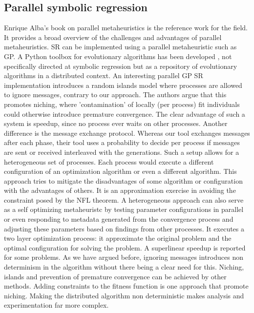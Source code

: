 \subsection{Parallel symbolic regression}
Enrique Alba's book \cite{parallelmetaheuristics} on parallel metaheuristics is the reference work for the field. It provides a broad overview of the challenges and advantages of parallel metaheuristics.  SR can be implemented using a parallel metaheuristic such as GP.
A Python toolbox for evolutionary algorithms has been developed \citep{DEAP}, not specifically directed at symbolic regression but as a repository of evolutionary algorithms in a distributed context.
An interesting parallel GP SR implementation \citep{DGPSR} introduces a random islands model where processes are allowed to ignore messages, contrary to our approach. The authors argue that this promotes niching, where 'contamination' of locally (per process) fit individuals could otherwise introduce premature convergence. The clear advantage of such a system is speedup, since no process ever waits on other processes. Another difference is the message exchange protocol. Whereas our tool exchanges messages after each phase, their tool uses a probability to decide per process if messages are sent or received interleaved with the generations. Such a setup allows for a heterogeneous set of processes.
Each process would execute a different configuration of an optimization algorithm or even a different algorithm.
This approach tries to mitigate the disadvantages of some algorithm or configuration with the advantages of others. It is an approximation exercise in avoiding the constraint posed by the NFL theorem. A heterogeneous approach can also serve as a self optimizing metaheuristc by testing parameter configurations in parallel or even responding to metadata generated from the convergence process and adjusting these parameters based on findings from other processes. It executes a two layer optimization process: it approximate the original problem and the optimal configuration for solving the problem. %
A superlinear speedup is reported for some problems. As we have argued before, ignoring messages introduces non determinism in the algorithm without there being a clear need for this. Niching, islands and prevention of premature convergence can be achieved by other methods. Adding constraints to the fitness function is one approach that promote niching. Making the distributed algorithm non deterministic makes analysis and experimentation far more complex. 
